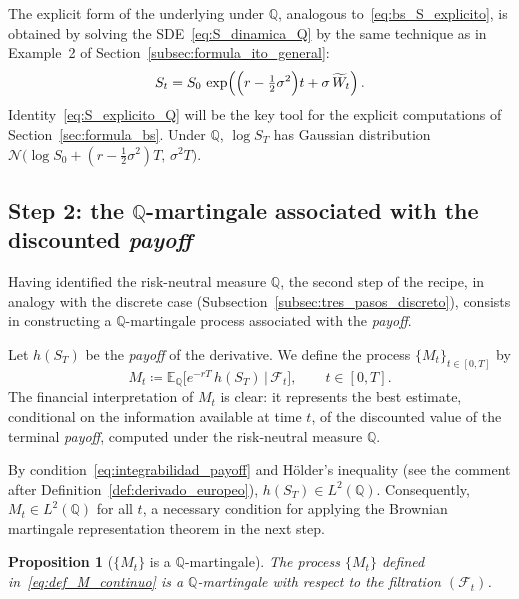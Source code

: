 \documentclass[11pt,a4paper,oneside]{report}
\theoremstyle{plain}
\newtheorem{proposicion}[teorema]{Proposition}
\theoremstyle{definition}
\theoremstyle{remark}
\newcommand{\E}{\mathbb{E}}
\newcommand{\Q}{\mathbb{Q}}
\newcommand{\F}{\mathcal{F}}
\newcommand{\1}{\mathbf{1}}
\newcommand{\eqdef}{\coloneqq}
\begin{document}
\noindent The explicit form of the underlying under $\Q$, analogous
to~\eqref{eq:bs_S_explicito}, is obtained by solving the
SDE~\eqref{eq:S_dinamica_Q} by the same technique as in Example~2 of
Section~\ref{subsec:formula_ito_general}:
\begin{equation}\label{eq:S_explicito_Q}
  S_t = S_0\, \exp\!\left(\Bigl(r - \tfrac{1}{2}\sigma^2\Bigr) t
                          + \sigma\, \widetilde W_t\right).
\end{equation}
Identity~\eqref{eq:S_explicito_Q} will be the key tool for the
explicit computations of Section~\ref{sec:formula_bs}. Under $\Q$,
$\log S_T$ has Gaussian distribution
$\mathcal{N}\bigl(\log S_0 + (r - \tfrac{1}{2}\sigma^2) T,\, \sigma^2 T\bigr)$.

\subsection{Step 2: the $\Q$-martingale associated with the discounted \emph{payoff}}
\label{subsec:paso2_martingala}

Having identified the risk-neutral measure $\Q$, the second step of
the recipe, in analogy with the discrete case
(Subsection~\ref{subsec:tres_pasos_discreto}), consists in
constructing a $\Q$-martingale process associated with the
\emph{payoff}.

Let $h(S_T)$ be the
\emph{payoff} of the derivative. We define the process
$\{M_t\}_{t \in [0, T]}$ by
\begin{equation}\label{eq:def_M_continuo}
  M_t \eqdef \E_\Q\!\bigl[e^{-rT}\, h(S_T) \,\big|\, \F_t\bigr],
  \qquad t \in [0, T].
\end{equation}
The financial interpretation of $M_t$ is clear: it represents the
best estimate, conditional on the information available at time $t$,
of the discounted value of the terminal \emph{payoff}, computed under
the risk-neutral measure $\Q$.

By condition~\eqref{eq:integrabilidad_payoff} and Hölder's inequality (see the comment after Definition~\ref{def:derivado_europeo}), $h(S_T) \in L^2(\Q)$.
Consequently, $M_t \in L^2(\Q)$ for all $t$, a necessary condition
for applying the Brownian martingale representation theorem in the
next step.

\begin{proposicion}[$\{M_t\}$ is a $\Q$-martingale]
\label{prop:M_es_Q_martingala}
The process $\{M_t\}$ defined in~\eqref{eq:def_M_continuo} is a
$\Q$-martingale with respect to the filtration $(\F_t)$.
\end{proposicion}
\end{document}
